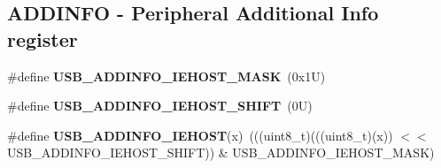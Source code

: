\subsection*{A\+D\+D\+I\+N\+FO -\/ Peripheral Additional Info register}
\begin{DoxyCompactItemize}
\item 
\mbox{\label{group___u_s_b___register___masks_gacb7c792034c73c4861bc8fba6ff4314f}} 
\#define {\bfseries U\+S\+B\+\_\+\+A\+D\+D\+I\+N\+F\+O\+\_\+\+I\+E\+H\+O\+S\+T\+\_\+\+M\+A\+SK}~(0x1\+U)
\item 
\mbox{\label{group___u_s_b___register___masks_gad256dcdfe8443877169b69dbcc8a041e}} 
\#define {\bfseries U\+S\+B\+\_\+\+A\+D\+D\+I\+N\+F\+O\+\_\+\+I\+E\+H\+O\+S\+T\+\_\+\+S\+H\+I\+FT}~(0\+U)
\item 
\mbox{\label{group___u_s_b___register___masks_gacdd8ba22b3c767cd5f2b22b79d861660}} 
\#define {\bfseries U\+S\+B\+\_\+\+A\+D\+D\+I\+N\+F\+O\+\_\+\+I\+E\+H\+O\+ST}(x)~(((uint8\+\_\+t)(((uint8\+\_\+t)(x)) $<$$<$ U\+S\+B\+\_\+\+A\+D\+D\+I\+N\+F\+O\+\_\+\+I\+E\+H\+O\+S\+T\+\_\+\+S\+H\+I\+FT)) \& U\+S\+B\+\_\+\+A\+D\+D\+I\+N\+F\+O\+\_\+\+I\+E\+H\+O\+S\+T\+\_\+\+M\+A\+SK)
\end{DoxyCompactItemize}
